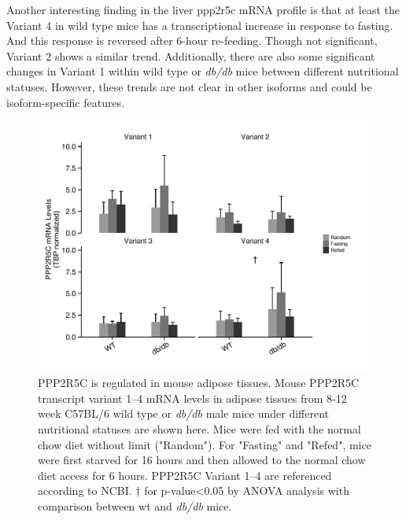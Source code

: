 Another interesting finding in the liver \gls{ppp2r5c} mRNA profile is that at least the Variant 4 in wild type mice has a transcriptional increase in response to fasting. And this response is reversed after 6-hour re-feeding. Though not significant, Variant 2 shows a similar trend. Additionally, there are also some significant changes in Variant 1 within wild type or \textit{db/db} mice between different nutritional statuses. However, these trends are not clear in other isoforms and could be isoform-specific features.


\begin{figure}[!tb]
\centering
\includegraphics[width=1\textwidth]{figs/fig2-2 adipose ppp2r5c.pdf}
\caption[PPP2R5C expression in adipose tissues]{\footnotesize PPP2R5C is regulated in mouse adipose tissues. Mouse PPP2R5C transcript variant 1--4 mRNA levels in adipose tissues from 8-12 week C57BL/6 wild type or \textit{db/db} male mice under different nutritional statuses are shown here. Mice were fed with the normal chow diet without limit ("Random"). For "Fasting" and "Refed", mice were first starved for 16 hours and then allowed to the normal chow diet access for 6 hours. PPP2R5C Variant 1--4 are referenced according to NCBI. $\dagger$ for p-value<0.05 by \gls{ANOVA} analysis with comparison between wt and \textit{db/db} mice.}
\label{fig:fig2.2}
\end{figure}

